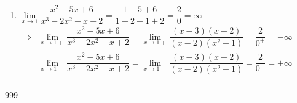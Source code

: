 \documentclass[a4paper]{article}
\newcommand{\fx}{\dfrac{x^2-5x+6}{x^3-2x^2-x+2}}
\newcommand{\llim}[1]{ \lim\limits_{x \rightarrow #1} }
\newcommand{\fxf}{\dfrac{(x-3)(x-2)}{(x-2)(x^2-1)}}
\begin{document}
\begin{enumerate}
\item $ \llim{1} \fx = \dfrac{1-5+6}{1-2-1+2} = \dfrac{2}{0} = \infty $ \\

$ \begin{array}{ll}
\Rightarrow & \llim{1+} \fx = \llim{1+} \fxf = \dfrac{2}{0^+} = -\infty \\
& \llim{1-} \fx = \llim{1-} \fxf = \dfrac{2}{0^-} = +\infty \\
\end{array} $  \\

\end{enumerate}


\begin{thebibliography}{999}
\end{thebibliography}
\end{document}
